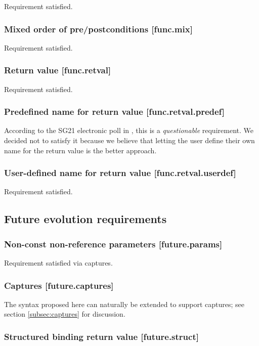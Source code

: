 Requirement satisfied.

\subsubsection{Mixed order of pre/postconditions  [func.mix]}

Requirement satisfied.

\subsubsection{Return value  [func.retval]}

Requirement satisfied.

\subsubsection{Predefined name for return value  [func.retval.predef]}

According to the SG21 electronic poll in \cite{P2885R3}, this is a \emph{questionable} requirement. We decided not to satisfy it because we believe that letting the user define their own name for the return value is the better approach.

\subsubsection{User-defined name for return value  [func.retval.userdef]}

Requirement satisfied.

\subsection{Future evolution requirements}

\subsubsection{Non-const non-reference parameters  [future.params]}

Requirement satisfied via captures.

\subsubsection{Captures  [future.captures]}

The syntax proposed here can naturally be extended to support captures; see section \ref{subsec:captures} for discussion.

\subsubsection{Structured binding return value  [future.struct]}

